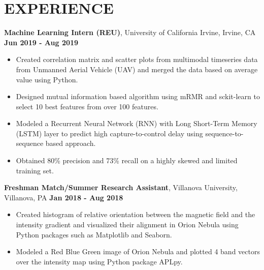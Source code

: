 \documentclass[letterpaper,11pt]{article}
\begin{document}
\section{\textbf{EXPERIENCE}}
            

      {\textbf{Machine Learning Intern (REU)}, University of California Irvine, Irvine, CA} 
      \null\hfill \textbf{Jun 2019 - Aug 2019}
      \begin{itemize}
      \itemsep0em 
          \item
            {Created correlation matrix and scatter plots from multimodal timeseries data from Unmanned Aerial Vehicle (UAV) and merged the data based on average value using Python.}
        \item
            {Designed mutual information based algorithm using mRMR and sckit-learn to select 10 best features from over 100 features.}
        \item
            {Modeled a Recurrent Neural Network (RNN) with Long Short-Term Memory (LSTM) layer to predict high capture-to-control delay using sequence-to-sequence based approach.}
        \item
            {Obtained 80\% precision and 73\% recall on a highly skewed and limited training set.}
      \end{itemize}
      
      {\textbf{Freshman Match/Summer Research Assistant}, Villanova University, Villanova, PA}
      \null\hfill \textbf{Jan 2018 - Aug 2018}
      \begin{itemize}
      \itemsep0em 
          \item
            {Created histogram of relative orientation between the magnetic field and the intensity gradient and visualized their alignment in Orion Nebula using Python packages such as Matplotlib and Seaborn.}
        \item
            {Modeled a Red Blue Green image of Orion Nebula and plotted 4 band vectors over the intensity map using Python package APLpy.}
      \end{itemize}
\end{document}
